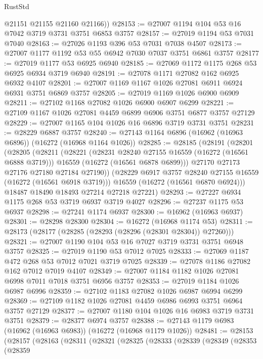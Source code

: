 \begin{lexlean}{RustStd}
\begin{coremodule}
        @21151
        @21155
        @21160
        @21166))
@28153 := @27007 @1194 @104 @53 @16 @7042 @3719 @3731 @3751 @6853 @3757
@28157 := @27019 @1194 @53 @7031 @7040
@28163 := @27026 @1193 @396 @53 @7031 @7038 @4507
@28173 := @27007 @1177 @1192 @53 @55 @6942 @7030 @7037 @3751 @6861 @3757
@28177 := @27019 @1177 @53 @6925 @6940
@28185 := @27069 @1172 @1175 @268 @53 @6925 @6934 @3719 @6940
@28191 := @27078 @1171 @27082 @162 @6925 @6932 @4107
@28201 := @27007 @1169 @1167 @1026 @27081 @6911 @6924 @6931 @3751 @6869 @3757
@28205 := @27019 @1169 @1026 @6900 @6909
@28211 := @27102 @1168 @27082 @1026 @6900 @6907 @6299
@28221 := @27109 @1167 @1026 @27081 @4459 @6899 @6906 @3751 @6877 @3757 @27129
@28229 := @27007 @1165 @104 @1026 @16 @6896 @3719 @3731 @3751
@28231 := @28229 @6887 @3757
@28240 := @27143 @1164 @6896 (@16962 (@16963 @6896)) (@16272 (@16968 @1164 @1026))
@28285 := @28185
    (@28191
      (@28201
        (@28205
          (@28211
            (@28221
              (@28231 @28240 @27155 @16559 (@16272 (@16561 @6888 @3719)))
              @16559
              (@16272 (@16561 @6878 @6899)))
            @27170
            @27173
            @27176
            @27180
            @27184
            @27190))
        (@28229 @6917 @3757 @28240 @27155 @16559 (@16272 (@16561 @6918 @3719)))
        @16559
        (@16272 (@16561 @6870 @6924)))
      @18487
      @18490
      @18493
      @27214
      @27218
      @27221)
@28293 := @27227 @6934 @1175 @268 @53 @3719 @6937 @3719 @4027
@28296 := @27237 @1175 @53 @6937
@28298 := @27241 @1174 @6937
@28300 := @16962 (@16963 @6937)
@28301 := @28298 @28300
@28304 := @16272 (@16968 @1174 @53)
@28311 := @28173 (@28177 (@28285 (@28293 (@28296 (@28301 @28304)) @27260)))
@28321 := @27007 @1190 @104 @53 @16 @7027 @3719 @3731 @3751 @6948 @3757
@28325 := @27019 @1190 @53 @7012 @7025
@28333 := @27069 @1187 @472 @268 @53 @7012 @7021 @3719 @7025
@28339 := @27078 @1186 @27082 @162 @7012 @7019 @4107
@28349 := @27007 @1184 @1182 @1026 @27081 @6998 @7011 @7018 @3751 @6956 @3757
@28353 := @27019 @1184 @1026 @6987 @6996
@28359 := @27102 @1183 @27082 @1026 @6987 @6994 @6299
@28369 := @27109 @1182 @1026 @27081 @4459 @6986 @6993 @3751 @6964 @3757 @27129
@28377 := @27007 @1180 @104 @1026 @16 @6983 @3719 @3731 @3751
@28379 := @28377 @6974 @3757
@28388 := @27143 @1179 @6983 (@16962 (@16963 @6983)) (@16272 (@16968 @1179 @1026))
@28481 := @28153
    (@28157
      (@28163
        (@28311
          (@28321
            (@28325
              (@28333
                (@28339
                  (@28349
                    (@28353
                      (@28359

\end{coremodule}
\end{lexlean}
